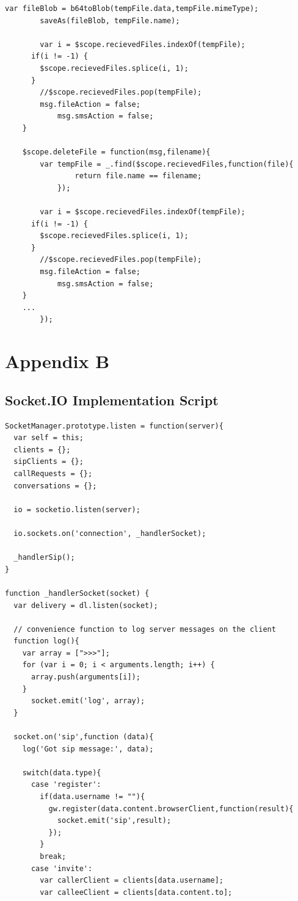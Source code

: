 \begin{appendices}
\begin{lstlisting}[caption={Files Sharing in ChatBoardCtrl.js},label={code:client_fileshare}]
  		var fileBlob = b64toBlob(tempFile.data,tempFile.mimeType);
  		saveAs(fileBlob, tempFile.name);

  		var i = $scope.recievedFiles.indexOf(tempFile);
      if(i != -1) {
        $scope.recievedFiles.splice(i, 1);
      }
  		//$scope.recievedFiles.pop(tempFile);
  		msg.fileAction = false;
			msg.smsAction = false;
  	}

  	$scope.deleteFile = function(msg,filename){
  		var tempFile = _.find($scope.recievedFiles,function(file){
				return file.name == filename;
			});

  		var i = $scope.recievedFiles.indexOf(tempFile);
      if(i != -1) {
        $scope.recievedFiles.splice(i, 1);
      }
  		//$scope.recievedFiles.pop(tempFile);
  		msg.fileAction = false;
			msg.smsAction = false;
  	}
  	...
  		});
\end{lstlisting}


\chapter{Appendix B}

\section{Socket.IO Implementation Script} 
\label{server:socket}

\begin{lstlisting}[caption={socket.js on Application Server},label={code:server_socket}]
SocketManager.prototype.listen = function(server){
  var self = this;
  clients = {};
  sipClients = {};
  callRequests = {};
  conversations = {};

  io = socketio.listen(server);

  io.sockets.on('connection', _handlerSocket);

  _handlerSip();
}

function _handlerSocket(socket) {
  var delivery = dl.listen(socket);

  // convenience function to log server messages on the client
  function log(){
    var array = [">>>"];
    for (var i = 0; i < arguments.length; i++) {
      array.push(arguments[i]);
    }
      socket.emit('log', array);
  }

  socket.on('sip',function (data){
    log('Got sip message:', data);

    switch(data.type){
      case 'register':
        if(data.username != ""){
          gw.register(data.content.browserClient,function(result){
            socket.emit('sip',result);
          });
        }
        break;
      case 'invite':
        var callerClient = clients[data.username];
        var calleeClient = clients[data.content.to];


\end{lstlisting}
\end{appendices}
